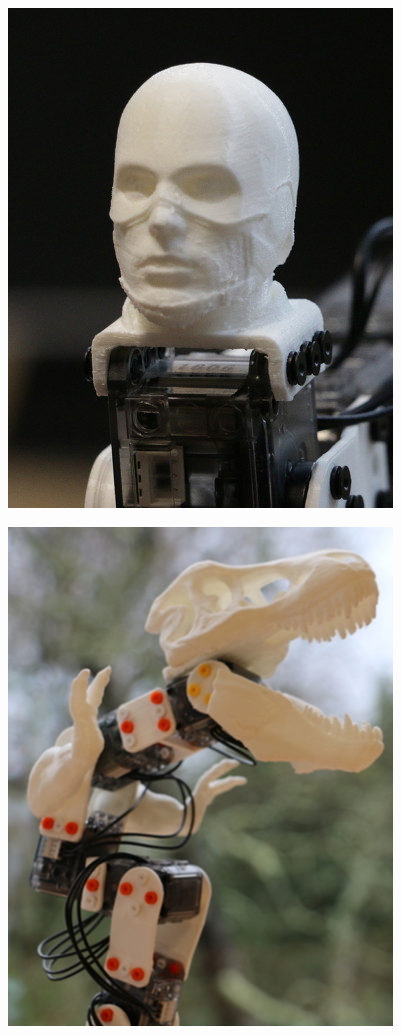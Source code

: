 \begin{figure}[!h]
\begin{minipage}{0.3\linewidth}
            \includegraphics[width=0.9\linewidth]{Figures/ergo-captain.jpg}
            \label{fig:ergo-captain}
        \end{minipage}
        \hfill
        \begin{minipage}{0.3\linewidth}
            \centering
            \includegraphics[width=0.9\linewidth]{Figures/ergo-sorus.png}

\end{minipage}
\end{figure}
